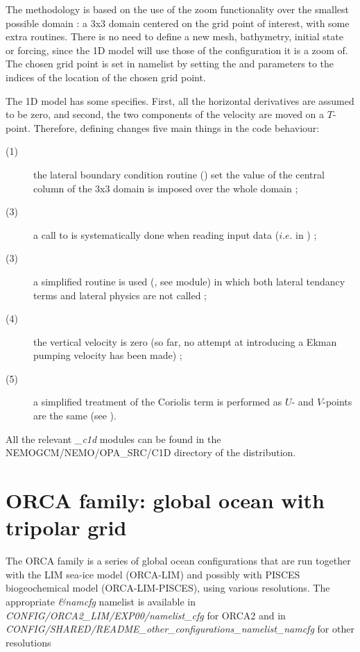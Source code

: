 \documentclass[NEMO_book]{subfiles}
\begin{document}
The methodology is based on the use of the zoom functionality over the smallest possible 
domain : a 3x3 domain centered on the grid point of interest, 
with some extra routines. There is no need to define a new mesh, bathymetry, 
initial state or forcing, since the 1D model will use those of the configuration it is a zoom of. 
The chosen grid point is set in \textit{} namelist by setting the  and  
parameters to the indices of the location of the chosen grid point.

The 1D model has some specifies. First, all the horizontal derivatives are assumed to be zero, and
second, the two components of the velocity are moved on a $T$-point. 
Therefore, defining  changes five main things in the code behaviour: 
\begin{description}
\item[(1)] the lateral boundary condition routine () set the value of the central column 
of the 3x3 domain is imposed over the whole domain ; 
\item[(3)] a call to  is systematically done when reading input data ($i.e.$ in ) ; 
\item[(3)] a simplified  routine is used (, see  module) in which 
both lateral tendancy terms and lateral physics are not called ; 
\item[(4)] the vertical velocity is zero (so far, no attempt at introducing a Ekman pumping velocity 
has been made) ; 
\item[(5)] a simplified treatment of the Coriolis term is performed as $U$- and $V$-points are the same 
(see ).
\end{description}
All the relevant \textit{\_c1d} modules can be found in the NEMOGCM/NEMO/OPA\_SRC/C1D directory of 
the \NEMO distribution.


\section{ORCA family: global ocean with tripolar grid }
\label{CFG_orca}

The ORCA family is a series of global ocean configurations that are run together with 
the LIM sea-ice model (ORCA-LIM) and possibly with PISCES biogeochemical model 
(ORCA-LIM-PISCES), using various resolutions.
The appropriate \textit{\&namcfg} namelist is available in \textit{CONFIG/ORCA2\_LIM/EXP00/namelist\_cfg} 
for ORCA2 and in \textit{CONFIG/SHARED/README\_other\_configurations\_namelist\_namcfg} 
for other resolutions
\end{document}
